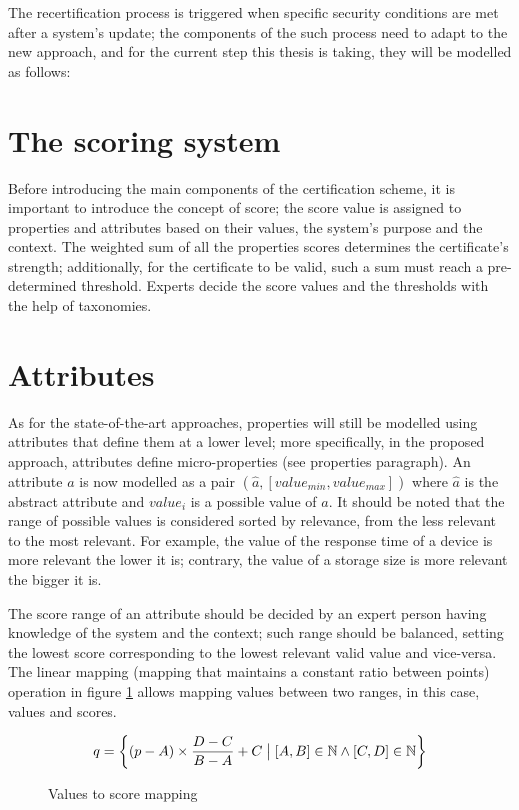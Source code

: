 The recertification process is triggered when specific security conditions are met after a system's update; the components of the such process need to adapt to the new approach, and for the current step this thesis is taking, they will be modelled as follows:

\section{The scoring system}
Before introducing the main components of the certification scheme, it is important to introduce the concept of score; the score value is assigned to properties and attributes based on their values, the system's purpose and the context. The weighted sum of all the properties scores determines the certificate's strength; additionally, for the certificate to be valid, such a sum must reach a pre-determined threshold. Experts decide the score values and the thresholds with the help of taxonomies.


\section{Attributes}
As for the state-of-the-art approaches, properties will still be modelled using attributes that define them at a lower level; more specifically, in the proposed approach, attributes define micro-properties (see properties paragraph). An attribute \(a\) is now modelled as a pair \((\hat{a}, [value_{min}, value_{max}])\) where \(\hat{a}\) is the abstract attribute and \(value_{i}\) is a possible value of \(a\). It should be noted that the range of possible values is considered sorted by relevance, from the less relevant to the most relevant. For example, the value of the response time of a device is more relevant the lower it is; contrary, the value of a storage size is more relevant the bigger it is.

The score range of an attribute should be decided by an expert person having knowledge of the system and the context; such range should be balanced, setting the lowest score corresponding to the lowest relevant valid value and vice-versa.
The linear mapping (mapping that maintains a constant ratio between points) operation in figure \ref{eqn:mapping} allows mapping values between two ranges, in this case, values and scores.

\begin{figure}[h]


\[q = \left \{ (p - A) \times \frac{D - C}{B - A} + C \bigm| [A, B] \in \mathbb{N} \wedge [C, D] \in \mathbb{N}  \right \} \]
\caption{Values to score mapping}
\label{eqn:mapping}
\end{figure}

